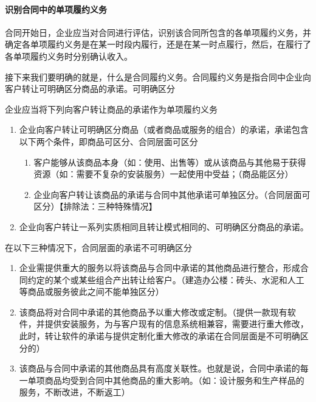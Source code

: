 \documentclass[UTF8,12pt]{ctexart}
\numberwithin{equation}{section} %
\numberwithin{figure}{section}
\numberwithin{table}{section}
\begin{document}
	\paragraph{识别合同中的单项履约义务}
	合同开始日，企业应当对合同进行评估，识别该合同所包含的各单项履约义务，并确定各单项履约义务是在某一时段内履行，还是在某一时点履行，然后，在履行了各单项履约义务时分别确认收入。
	
	接下来我们要明确的就是，什么是合同履约义务。合同履约义务是指合同中企业向客户转让可明确区分商品的承诺。可明确区分
	
	企业应当将下列向客户转让商品的承诺作为单项履约义务
	\begin{enumerate}
		\item 企业向客户转让可明确区分商品（或者商品或服务的组合）的承诺，承诺包含以下两个条件，即商品可区分、合同层面可区分
		\begin{enumerate}
			\item 客户能够从该商品本身（如：使用、出售等）或从该商品与其他易于获得资源（如：需要不复杂的安装服务）一起使用中受益；（商品能区分）
			
			\item 企业向客户转让该商品的承诺与合同中其他承诺可单独区分。（合同层面可区分）【排除法：三种特殊情况】
		\end{enumerate}
		
		\item 企业向客户转让一系列实质相同且转让模式相同的、可明确区分商品的承诺。
	\end{enumerate}

	在以下三种情况下，合同层面的承诺不可明确区分
	\begin{enumerate}
		\item 企业需提供重大的服务以将该商品与合同中承诺的其他商品进行整合，形成合同约定的某个或某些组合产出转让给客户。（建造办公楼：砖头、水泥和人工等商品或服务彼此之间不能单独区分）
		
		\item 该商品将对合同中承诺的其他商品予以重大修改或定制。（提供一款现有软件，并提供安装服务，为与客户现有的信息系统相兼容，需要进行重大修改，此时，转让软件的承诺与提供定制化重大修改的承诺在合同层面是不可明确区分的）
		
		\item 该商品与合同中承诺的其他商品具有高度关联性。也就是说，合同中承诺的每一单项商品均受到合同中其他商品的重大影响。（如：设计服务和生产样品的服务，不断改进，不断返工）
		
	\end{enumerate}
\end{document}
